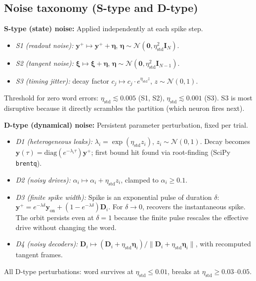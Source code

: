 \documentclass[12pt]{article}
\newcommand{\vv}[1]{\mathbf{#1}}
\newcommand{\DD}{\vv{D}}
\newcommand{\yy}{\vv{y}}
\newcommand{\xxi}{\boldsymbol{\xi}}
\begin{document}
\subsection{Noise taxonomy (S-type and D-type)}\label{app:noise}

\textbf{S-type (state) noise:} Applied independently at each spike step.
\begin{itemize}[nosep]
    \item \emph{S1 (readout noise):} $\yy^+\mapsto\yy^++\boldsymbol{\eta}$, $\boldsymbol{\eta}\sim\mathcal{N}(\vv{0},\eta_{\text{std}}^2\vv{I}_N)$.
    \item \emph{S2 (tangent noise):} $\xxi\mapsto\xxi+\boldsymbol{\eta}$, $\boldsymbol{\eta}\sim\mathcal{N}(\vv{0},\eta_{\text{std}}^2\vv{I}_{N-1})$.
    \item \emph{S3 (timing jitter):} decay factor $c_j\mapsto c_j\cdot e^{\eta_{\text{std}} z}$, $z\sim\mathcal{N}(0,1)$.
\end{itemize}
Threshold for zero word errors: $\eta_{\text{std}}\lesssim 0.005$ (S1, S2), $\eta_{\text{std}}\lesssim 0.001$ (S3). S3 is most disruptive because it directly scrambles the partition (which neuron fires next).

\textbf{D-type (dynamical) noise:} Persistent parameter perturbation, fixed per trial.
\begin{itemize}[nosep]
    \item \emph{D1 (heterogeneous leaks):} $\lambda_i=\exp(\eta_{\text{std}} z_i)$, $z_i\sim\mathcal{N}(0,1)$. Decay becomes $\yy(\tau)=\mathrm{diag}(e^{-\lambda_i\tau})\yy^+$; first bound hit found via root-finding (SciPy \texttt{brentq}).
    \item \emph{D2 (noisy drives):} $\alpha_i\mapsto\alpha_i+\eta_{\text{std}} z_i$, clamped to $\alpha_i\geq 0.1$.
    \item \emph{D3 (finite spike width):} Spike is an exponential pulse of duration $\delta$: $\yy^+=e^{-\lambda\delta}\yy_{\text{on}}+(1-e^{-\lambda\delta})\DD_i$. For $\delta\to 0$, recovers the instantaneous spike. The orbit persists even at $\delta=1$ because the finite pulse rescales the effective drive without changing the word.
    \item \emph{D4 (noisy decoders):} $\DD_i\mapsto(\DD_i+\eta_{\text{std}}\boldsymbol{\eta}_i)/\|\DD_i+\eta_{\text{std}}\boldsymbol{\eta}_i\|$, with recomputed tangent frames.
\end{itemize}
All D-type perturbations: word survives at $\eta_{\text{std}}\leq 0.01$, breaks at $\eta_{\text{std}}\geq 0.03$--$0.05$.
\end{document}

